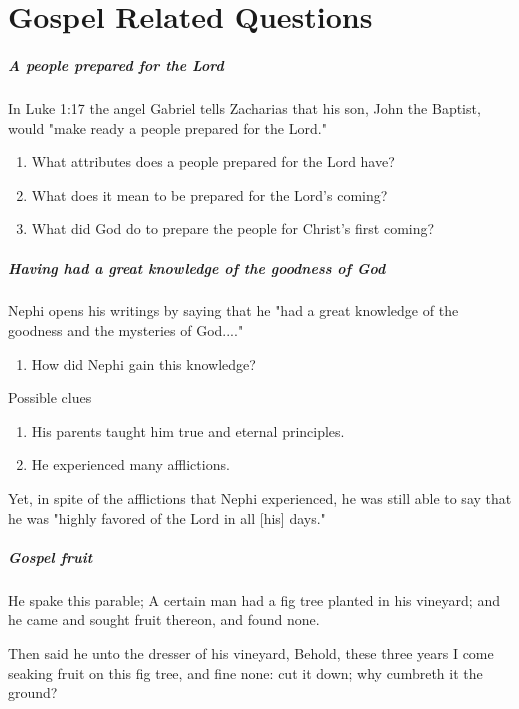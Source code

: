 \chapter{Gospel Related Questions}

\paragraph{A people prepared for the Lord}
In Luke 1:17 the angel Gabriel tells Zacharias that his son, John the Baptist, would "make ready a people prepared for the Lord."
\begin{enumerate}
  \item What attributes does a people prepared for the Lord have?
  \item What does it mean to be prepared for the Lord's coming?
  \item What did God do to prepare the people for Christ's first coming?
\end{enumerate}

\paragraph{Having had a great knowledge of the goodness of God}
Nephi opens his writings by saying that he "had a great knowledge of the goodness and the mysteries of God...."
\begin{enumerate}
  \item How did Nephi gain this knowledge?
\end{enumerate}

Possible clues \begin{enumerate}
  \item His parents taught him true and eternal principles.
  \item He experienced many afflictions.
\end{enumerate}

Yet, in spite of the afflictions that Nephi experienced, he was still able to say that he was "highly favored of the Lord in all [his] days."

\paragraph{Gospel fruit}
He spake this parable; A certain man had a fig tree planted in his vineyard; and he came and sought fruit thereon, and found none.

Then said he unto the dresser of his vineyard, Behold, these three years I come seaking fruit on this fig tree, and fine none: cut it down; why cumbreth it the ground?

